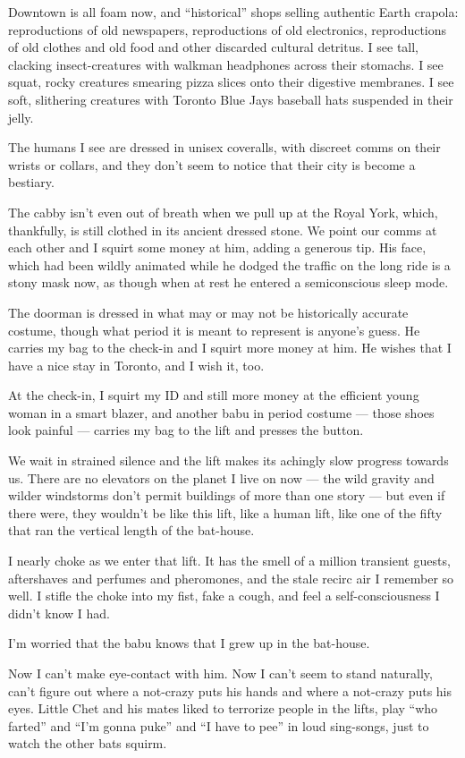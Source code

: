 Downtown is all foam now, and ``historical'' shops selling
authentic Earth crapola: reproductions of old newspapers,
reproductions of old electronics, reproductions of old clothes and
old food and other discarded cultural detritus. I see tall,
clacking insect-creatures with walkman headphones across their
stomachs. I see squat, rocky creatures smearing pizza slices onto
their digestive membranes. I see soft, slithering creatures with
Toronto Blue Jays baseball hats suspended in their jelly.

The humans I see are dressed in unisex coveralls, with discreet
comms on their wrists or collars, and they don't seem to notice
that their city is become a bestiary.

The cabby isn't even out of breath when we pull up at the Royal
York, which, thankfully, is still clothed in its ancient dressed
stone. We point our comms at each other and I squirt some money at
him, adding a generous tip. His face, which had been wildly
animated while he dodged the traffic on the long ride is a stony
mask now, as though when at rest he entered a semiconscious sleep
mode.

The doorman is dressed in what may or may not be historically
accurate costume, though what period it is meant to represent is
anyone's guess. He carries my bag to the check-in and I squirt more
money at him. He wishes that I have a nice stay in Toronto, and I
wish it, too.

At the check-in, I squirt my ID and still more money at the
efficient young woman in a smart blazer, and another babu in period
costume --- those shoes look painful --- carries my bag to the lift
and presses the button.

We wait in strained silence and the lift makes its achingly slow
progress towards us. There are no elevators on the planet I live on
now --- the wild gravity and wilder windstorms don't permit
buildings of more than one story --- but even if there were, they
wouldn't be like this lift, like a human lift, like one of the
fifty that ran the vertical length of the bat-house.

I nearly choke as we enter that lift. It has the smell of a million
transient guests, aftershaves and perfumes and pheromones, and the
stale recirc air I remember so well. I stifle the choke into my
fist, fake a cough, and feel a self-consciousness I didn't know I
had.

I'm worried that the babu knows that I grew up in the bat-house.

Now I can't make eye-contact with him. Now I can't seem to stand
naturally, can't figure out where a not-crazy puts his hands and
where a not-crazy puts his eyes. Little Chet and his mates liked to
terrorize people in the lifts, play ``who farted'' and
``I'm gonna puke'' and ``I have to pee'' in loud sing-songs, just
to watch the other bats squirm.

